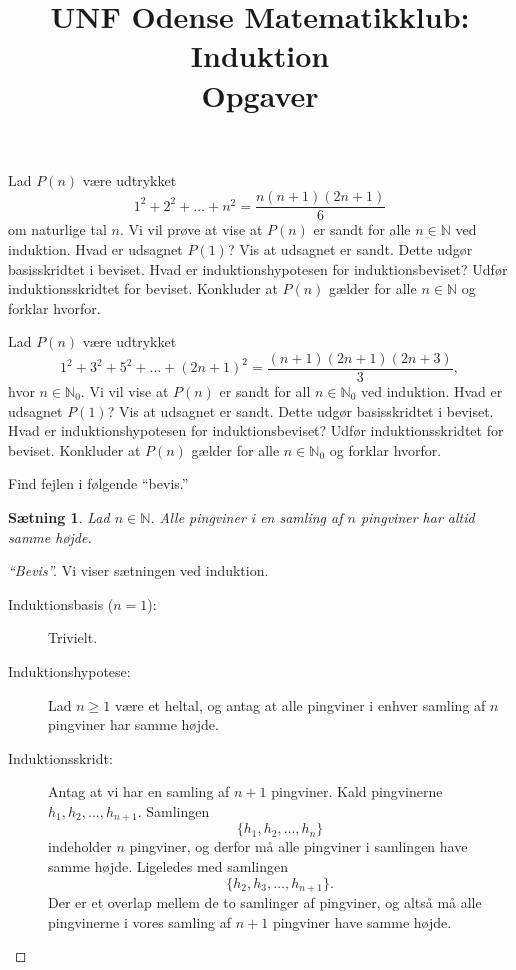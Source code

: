 \documentclass[a4paper,12pt]{article}
\title{UNF Odense Matematikklub: Induktion\\
\Large{Opgaver}}
\author{}
\date{}
\theoremstyle{plain}
\newtheorem{saetning}{Sætning}[section]
\newcommand{\N}{\mathbb{N}}
\begin{document}
\maketitle
\thispagestyle{empty}
\newpage
\setcounter{page}{1}
\begin{Exercise}[label={ex:1}]
  Lad \(P(n)\) være udtrykket
  \[
    1^2+2^2+\dots+n^2=\frac{n(n+1)(2n+1)}{6}
    \]
    om naturlige tal \(n\). Vi vil prøve at vise at \(P(n)\) er sandt for alle \(n\in\N\) ved induktion.
    \Question Hvad er udsagnet \(P(1)\)? Vis at udsagnet er sandt. Dette udgør basisskridtet i beviset.
    \Question Hvad er induktionshypotesen for induktionsbeviset?
    \Question Udfør induktionsskridtet for beviset.
    \Question Konkluder at \(P(n)\) gælder for alle \(n\in\N\) og forklar hvorfor.
\end{Exercise}
\begin{Exercise}
 Lad \(P(n)\) være udtrykket
  \[
    1^2+3^2+5^2+\dots+(2n+1)^2=\frac{(n+1)(2n+1)(2n+3)}{3},
    \]
    hvor \(n\in\N_0\). Vi vil vise at \(P(n)\) er sandt for all \(n\in\N_0\) ved induktion.
    \Question Hvad er udsagnet \(P(1)\)? Vis at udsagnet er sandt. Dette udgør basisskridtet i beviset.
    \Question Hvad er induktionshypotesen for induktionsbeviset?
    \Question Udfør induktionsskridtet for beviset.
    \Question Konkluder at \(P(n)\) gælder for alle \(n\in\N_0\) og forklar hvorfor.
\end{Exercise}
\begin{Exercise}
  Find fejlen i følgende ``bevis.''
  \begin{saetning}
    Lad \(n\in\N\). Alle pingviner i en samling af \(n\) pingviner har altid samme højde.
  \end{saetning}
  \begin{proof}[``Bevis'']
    Vi viser sætningen ved induktion.
    \begin{description}
    \item[Induktionsbasis (\(n=1\)):] Trivielt.
    \item[Induktionshypotese:] Lad \(n\ge 1\) være et heltal, og antag at alle pingviner i enhver samling af \(n\) pingviner har samme højde.
    \item[Induktionsskridt:] Antag at vi har en samling af \(n+1\) pingviner. Kald pingvinerne \(h_1,h_2,\dots,h_{n+1}\). Samlingen
      \[
        \{h_1,h_2,\ldots,h_n\}
      \]
        indeholder \(n\) pingviner, og derfor må alle pingviner i samlingen have samme højde. Ligeledes med samlingen
      \[
          \{h_2,h_3,\ldots,h_{n+1}\}.
      \]
      Der er et overlap mellem de to samlinger af pingviner, og altså må alle pingvinerne i vores samling af \(n+1\) pingviner have samme højde.
    \end{description}
  \end{proof}
\end{Exercise}
\end{document}
